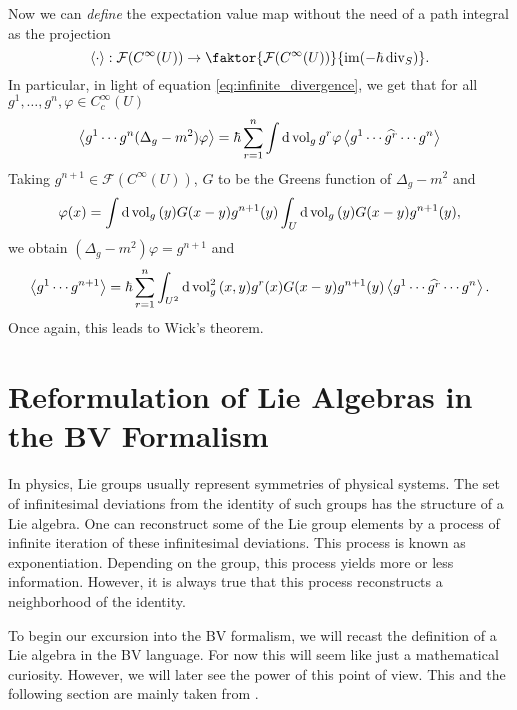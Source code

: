 Now we can \textit{define} the expectation value map without the need of a path integral as the projection
\begin{equation}
\ev{\cdot}:\mathcal{F}(C^\infty(U))\rightarrow\faktor{\mathcal{F}(C^\infty(U))}{\im (-\hbar\Div_S)}.
\end{equation}
In particular, in light of equation \eqref{eq:infinite_divergence}, we get that for all $g^1,\dots,g^n,\varphi\in C^\infty_c(U)$
\begin{equation}
\ev{g^1\cdots g^n(\Delta_g-m^2)\varphi}=\hbar\sum_{r=1}^n\int\dd{\vol_g}g^r\varphi\ev{g^1\cdots\widehat{g^r}\cdots g^n}
\end{equation}
Taking $g^{n+1}\in\mathcal{F}(C^\infty(U))$, $G$ to be the Greens function of $\Delta_g-m^2$ and 
\begin{equation}
\varphi(x)=\int\dd{\operatorname{vol}_g}(y)G(x-y)g^{n+1}(y)\int_U\dd{\operatorname{vol}_g}(y)G(x-y)g^{n+1}(y),
\end{equation}
we obtain $(\Delta_g-m^2)\varphi=g^{n+1}$ and 
\begin{equation}
\ev{g^1\cdots g^{n+1}}=\hbar\sum_{r=1}^n\int_{U^2}\dd{\vol_g^2}(x,y)g^r(x)G(x-y)g^{n+1}(y)\ev{g^1\cdots\widehat{g^r}\cdots g^n}.
\end{equation}
Once again, this leads to Wick's theorem.

\section{Reformulation of Lie Algebras in the BV Formalism}

In physics, Lie groups usually represent symmetries of physical systems. The set of infinitesimal deviations from the identity of such groups has the structure of a Lie algebra. One can reconstruct some of the Lie group elements by a process of infinite iteration of these infinitesimal deviations. This process is known as exponentiation. Depending on the group, this process yields more or less information. However, it is always true that this process reconstructs a neighborhood of the identity.

To begin our excursion into the BV formalism, we will recast the definition of a Lie algebra in the BV language. For now this will seem like just a mathematical curiosity. However, we will later see the power of this point of view. This and the following section are mainly taken from \cite{Fiorenza2008}.

